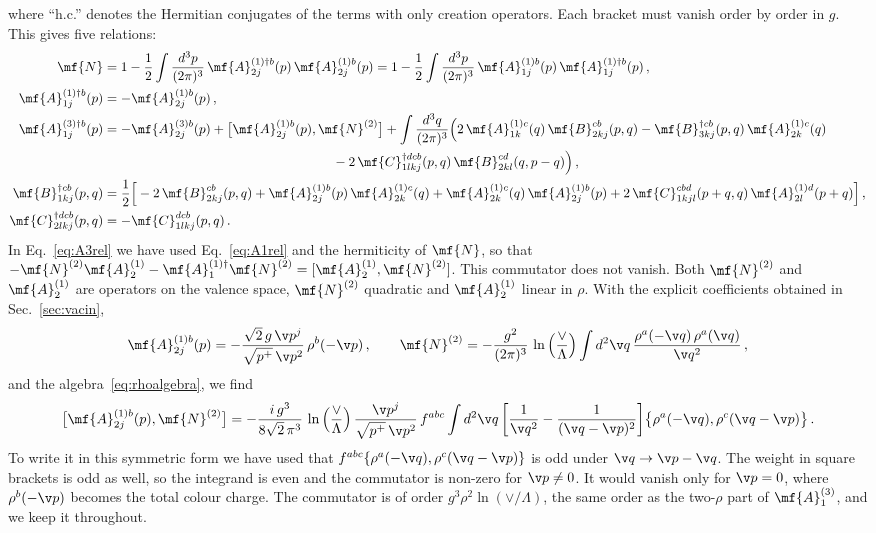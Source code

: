 where ``h.c.'' denotes the Hermitian conjugates of the terms with only creation operators. Each
bracket must vanish order by order in $g$. This gives five relations:
\begin{align}
\mf{N}&=1-\frac{1}{2}\int\frac{d^{3}p}{(2\pi)^{3}}\,\mf{A}^{(1)\dagger b}_{2j}(p)\,\mf{A}^{(1)b}_{2j}(p)
=1-\frac{1}{2}\int\frac{d^{3}p}{(2\pi)^{3}}\,\mf{A}^{(1)b}_{1j}(p)\,\mf{A}^{(1)\dagger b}_{1j}(p)\,,\label{eq:Nrel}\\
\mf{A}^{(1)\dagger b}_{1j}(p)&=-\mf{A}^{(1)b}_{2j}(p)\,,\label{eq:A1rel}\\
\mf{A}^{(3)\dagger b}_{1j}(p)&=-\mf{A}^{(3)b}_{2j}(p)+\big[\mf{A}^{(1)b}_{2j}(p),\mf{N}^{(2)}\big]
+\int\frac{d^{3}q}{(2\pi)^{3}}\Big(2\,\mf{A}^{(1)c}_{1k}(q)\,\mf{B}^{cb}_{2kj}(p,q)
-\mf{B}^{\dagger cb}_{3kj}(p,q)\,\mf{A}^{(1)c}_{2k}(q)\notag\\
&\hspace{6.1cm}-2\,\mf{C}^{\dagger dcb}_{1lkj}(p,q)\,\mf{B}^{cd}_{2kl}(q,p-q)\Big)\,,\label{eq:A3rel}\\
\mf{B}^{\dagger cb}_{1kj}(p,q)&=\frac{1}{2}\Big[-2\,\mf{B}^{cb}_{2kj}(p,q)+\mf{A}^{(1)b}_{2j}(p)\,\mf{A}^{(1)c}_{2k}(q)+\mf{A}^{(1)c}_{2k}(q)\,\mf{A}^{(1)b}_{2j}(p)
+2\,\mf{C}^{cbd}_{1kjl}(p+q,q)\,\mf{A}^{(1)d}_{2l}(p+q)\Big]\,,\label{eq:B1rel}\\
\mf{C}^{\dagger dcb}_{2lkj}(p,q)&=-\mf{C}^{dcb}_{1lkj}(p,q)\,.\label{eq:C2rel}
\end{align}
In Eq.~\eqref{eq:A3rel} we have used Eq.~\eqref{eq:A1rel} and the hermiticity of $\mf{N}$, so that
$-\mf{N}^{(2)}\mf{A}^{(1)}_{2}-\mf{A}^{(1)\dagger}_{1}\mf{N}^{(2)}=[\mf{A}^{(1)}_{2},\mf{N}^{(2)}]$.
This commutator does not vanish. Both $\mf{N}^{(2)}$ and $\mf{A}^{(1)}_{2}$ are operators on the valence
space, $\mf{N}^{(2)}$ quadratic and $\mf{A}^{(1)}_{2}$ linear in $\rho$. With the explicit coefficients
obtained in Sec.~\ref{sec:vacin},
\begin{align}\label{eq:A1N2explicit}
\mf{A}^{(1)b}_{2j}(p)=-\frac{\sqrt{2}\,g\,\v p^{j}}{\sqrt{p^{+}}\,\v p^{2}}\,\rho^{b}(-\v p)\,,\qquad
\mf{N}^{(2)}=-\frac{g^{2}}{(2\pi)^{3}}\,\ln\Big(\frac{\vee}{\Lambda}\Big)\int d^{2}\v q\,
\frac{\rho^{a}(-\v q)\,\rho^{a}(\v q)}{\v q^{2}}\,,
\end{align}
and the algebra~\eqref{eq:rhoalgebra}, we find
\begin{align}\label{eq:NAcomm}
\big[\mf{A}^{(1)b}_{2j}(p),\mf{N}^{(2)}\big]=-\frac{i\,g^{3}}{8\sqrt{2}\,\pi^{3}}\,\ln\Big(\frac{\vee}{\Lambda}\Big)\,
\frac{\v p^{j}}{\sqrt{p^{+}}\,\v p^{2}}\,f^{abc}\int d^{2}\v q\,
\bigg[\frac{1}{\v q^{2}}-\frac{1}{(\v q-\v p)^{2}}\bigg]\big\{\rho^{a}(-\v q),\rho^{c}(\v q-\v p)\big\}\,.
\end{align}
To write it in this symmetric form we have used that $f^{abc}\{\rho^{a}(-\v q),\rho^{c}(\v q-\v p)\}$ is odd
under $\v q\to\v p-\v q$. The weight in square brackets is odd as well, so the integrand is even and the
commutator is non-zero for $\v p\neq0$. It would vanish only for $\v p=0$, where $\rho^{b}(-\v p)$
becomes the total colour charge. The commutator is of order $g^{3}\rho^{2}\ln(\vee/\Lambda)$, the same
order as the two-$\rho$ part of $\mf{A}^{(3)}_{1}$, and we keep it throughout.

